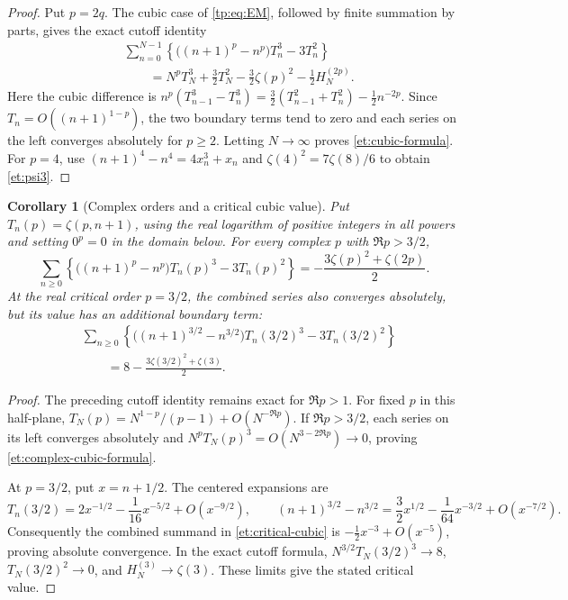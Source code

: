 \documentclass[11pt,a4paper]{article}
\numberwithin{equation}{section}
\newtheorem{corollary}[theorem]{Corollary}
\theoremstyle{definition}
\theoremstyle{remark}
\begin{document}
\begin{proof}
Put $p=2q$. The cubic case of \eqref{tp:eq:EM}, followed by finite
summation by parts, gives the exact cutoff identity
\begin{align*}
 &\sum_{n=0}^{N-1}\left\{
       \bigl((n+1)^p-n^p\bigr)T_n^3-3T_n^2\right\}\\
 &\qquad=N^pT_N^3+\frac32T_N^2
       -\frac32\zeta(p)^2-\frac12H_N^{(2p)}.
\end{align*}
Here the cubic difference is
$n^p(T_{n-1}^3-T_n^3)
 =\tfrac32(T_{n-1}^2+T_n^2)-\tfrac12n^{-2p}$.
Since $T_n=O((n+1)^{1-p})$, the two boundary terms tend to zero
and each series on the left converges absolutely for $p\geq2$.
Letting $N\to\infty$ proves \eqref{et:cubic-formula}.
For $p=4$, use $(n+1)^4-n^4=4x_n^3+x_n$ and
$\zeta(4)^2=7\zeta(8)/6$ to obtain \eqref{et:psi3}.
\end{proof}

\begin{corollary}[Complex orders and a critical cubic value]
\label{et:complex-cubic}
Put $T_n(p)=\zeta(p,n+1)$, using the real logarithm of positive
integers in all powers and setting $0^p=0$ in the domain below.
For every complex $p$ with $\Re p>3/2$,
\begin{equation}\label{et:complex-cubic-formula}
 \sum_{n\geq0}\left\{
    \bigl((n+1)^p-n^p\bigr)T_n(p)^3-3T_n(p)^2\right\}
       =-\frac{3\zeta(p)^2+\zeta(2p)}2.
\end{equation}
At the real critical order $p=3/2$, the combined series also converges
absolutely, but its value has an additional boundary term:
\begin{equation}\label{et:critical-cubic}
 \boxed{\begin{aligned}
 &\sum_{n\geq0}\left\{
    \bigl((n+1)^{3/2}-n^{3/2}\bigr)T_n(3/2)^3-3T_n(3/2)^2\right\}
 \\[-1mm]
 &\qquad=8-\frac{3\zeta(3/2)^2+\zeta(3)}2.
 \end{aligned}}
\end{equation}
\end{corollary}

\begin{proof}
The preceding cutoff identity remains exact for $\Re p>1$.
For fixed $p$ in this half-plane,
$T_N(p)=N^{1-p}/(p-1)+O(N^{-\Re p})$.
If $\Re p>3/2$, each series on its left converges absolutely and
$N^pT_N(p)^3=O(N^{3-2\Re p})\to0$, proving
\eqref{et:complex-cubic-formula}.

At $p=3/2$, put $x=n+1/2$. The centered expansions are
\[
 T_n(3/2)=2x^{-1/2}-\frac1{16}x^{-5/2}+O(x^{-9/2}),\qquad
 (n+1)^{3/2}-n^{3/2}
       =\frac32x^{1/2}-\frac1{64}x^{-3/2}+O(x^{-7/2}).
\]
Consequently the combined summand in \eqref{et:critical-cubic} is
$-\tfrac12x^{-3}+O(x^{-5})$, proving absolute convergence.
In the exact cutoff formula,
$N^{3/2}T_N(3/2)^3\to8$, $T_N(3/2)^2\to0$, and
$H_N^{(3)}\to\zeta(3)$. These limits give the stated critical value.
\end{proof}
\end{document}
